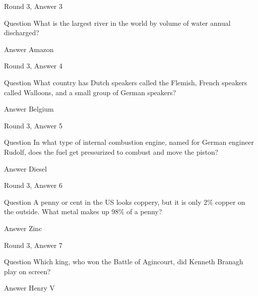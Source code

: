 \documentclass[11pt]{beamer}
\begin{document}
\begin{frame}[t]{Round 3, Answer 3}
\vspace{2em}
\begin{block}{Question}
What is the largest river in the world by volume of water annual discharged\@?
\end{block}
\pause{}
\begin{block}{Answer}
Amazon
\end{block}
\end{frame}
    

\begin{frame}[t]{Round 3, Answer 4}
\vspace{2em}
\begin{block}{Question}
What country has Dutch speakers called the Flemish, French speakers called Walloons, and a small group of German speakers\@?
\end{block}
\pause{}
\begin{block}{Answer}
Belgium
\end{block}
\end{frame}
    

\begin{frame}[t]{Round 3, Answer 5}
\vspace{2em}
\begin{block}{Question}
In what type of internal combustion engine, named for German engineer Rudolf, does the fuel get pressurized to combust and move the piston\@?
\end{block}
\pause{}
\begin{block}{Answer}
Diesel
\end{block}
\end{frame}
    

\begin{frame}[t]{Round 3, Answer 6}
\vspace{2em}
\begin{block}{Question}
A penny or cent in the US looks coppery, but it is only 2\% copper on the outside. What metal makes up 98\% of a penny\@?
\end{block}
\pause{}
\begin{block}{Answer}
Zinc
\end{block}
\end{frame}
    

\begin{frame}[t]{Round 3, Answer 7}
\vspace{2em}
\begin{block}{Question}
Which king, who won the Battle of Agincourt, did Kenneth Branagh play on screen\@?
\end{block}
\pause{}
\begin{block}{Answer}
Henry V
\end{block}
\end{frame}
    
\end{document}
